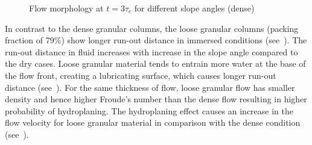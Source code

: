 \begin{figure}
\caption{Flow morphology at $t = 3 \tau_c$ for different slope angles (dense)}
\label{fig:slope_dense}
\end{figure}

In contrast to the dense granular columns, the loose granular columns (packing 
fraction of 79\%) show longer run-out distance in immersed conditions 
(see~). The run-out distance in fluid increases with 
increase in the slope angle compared to the dry cases. Loose granular material 
tends to entrain more water at the base of the flow 
front, creating a lubricating surface, which causes longer run-out distance 
(see~). For the same thickness of flow, loose granular 
flow has smaller density and hence higher Froude's number than the dense flow 
resulting in higher probability of hydroplaning. The hydroplaning effect causes 
an increase in the flow velocity for loose granular material in comparison with 
the dense condition (see~).

